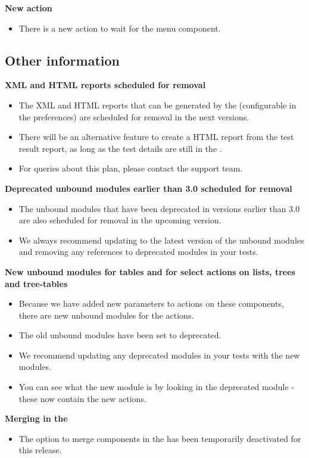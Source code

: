 \textbf{New action}
\begin{itemize}
\item There is a new action to wait for the menu component.
\end{itemize}

\subsection{Other information}
\textbf{XML and HTML reports scheduled for removal}
\begin{itemize}
\item The XML and HTML reports that can be generated by the \ite{} (configurable in the preferences) are scheduled for removal in the next versions. 
\item There will be an alternative feature to create a HTML report from the test result report, as long as the test details are still in the \gddb{}.
\item For queries about this plan, please contact the support team.
\end{itemize}

\textbf{Deprecated unbound modules earlier than 3.0 scheduled for removal}
\begin{itemize}
\item The unbound modules that have been deprecated in versions earlier than 3.0 are also scheduled for removal in the upcoming version. 
\item We always recommend updating to the latest version of the unbound modules and removing any references to deprecated modules in your tests. 
\end{itemize}

\textbf{New unbound modules for tables and for select actions on lists, trees and tree-tables}
\begin{itemize}
\item Because we have added new parameters to actions on these components, there are new unbound modules for the actions.
\item The old unbound modules have been set to deprecated. 
\item We recommend updating any deprecated modules in your tests with the new modules.
\item You can see what the new module is by looking in the deprecated module - these now contain the new actions. 
\end{itemize}

\textbf{Merging in the \gdomeditor}
\begin{itemize}
\item The option to merge components in the \gdomeditor{} has been temporarily deactivated for this release. 
\end{itemize}

